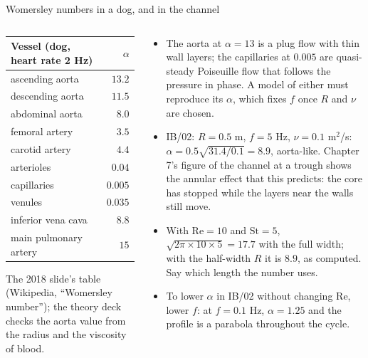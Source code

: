 \documentclass[aspectratio=169,11pt]{beamer}
\begin{document}
\begin{frame}{Womersley numbers in a dog, and in the channel}
\label{fr:womersley2}
\begin{columns}[T,onlytextwidth]
\begin{column}{0.42\textwidth}
\scriptsize
\begin{tabular}{@{}L{0.5\textwidth}r@{}}
\toprule
Vessel (dog, heart rate 2 Hz) & $\alpha$\\
\midrule
ascending aorta & $13.2$\\
descending aorta & $11.5$\\
abdominal aorta & $8.0$\\
femoral artery & $3.5$\\
carotid artery & $4.4$\\
arterioles & $0.04$\\
capillaries & $0.005$\\
venules & $0.035$\\
inferior vena cava & $8.8$\\
main pulmonary artery & $15$\\
\bottomrule
\end{tabular}

\vspace{1mm}
\scriptsize The 2018 slide's table (Wikipedia, ``Womersley number''); the theory deck checks the aorta value from the radius and the viscosity of blood.
\end{column}
\begin{column}{0.56\textwidth}
\small
\begin{itemize}
  \item The aorta at $\alpha = 13$ is a plug flow with thin wall layers; the capillaries at $0.005$ are quasi-steady Poiseuille flow that follows the pressure in phase. A model of either must reproduce its $\alpha$, which fixes $f$ once $R$ and $\nu$ are chosen.
  \item IB/02: $R = 0.5$ m, $f = 5$ Hz, $\nu = 0.1$ m$^2$/s: $\alpha = 0.5\sqrt{31.4/0.1} = 8.9$, aorta-like. Chapter 7's figure of the channel at a trough shows the annular effect that this predicts: the core has stopped while the layers near the walls still move.
  \item With $\mathrm{Re} = 10$ and $\mathrm{St} = 5$, $\sqrt{2\pi\times10\times5} = 17.7$ with the full width; with the half-width $R$ it is $8.9$, as computed. Say which length the number uses.
  \item To lower $\alpha$ in IB/02 without changing $\mathrm{Re}$, lower $f$: at $f = 0.1$ Hz, $\alpha = 1.25$ and the profile is a parabola throughout the cycle.
\end{itemize}
\end{column}
\end{columns}
\end{frame}
\end{document}
